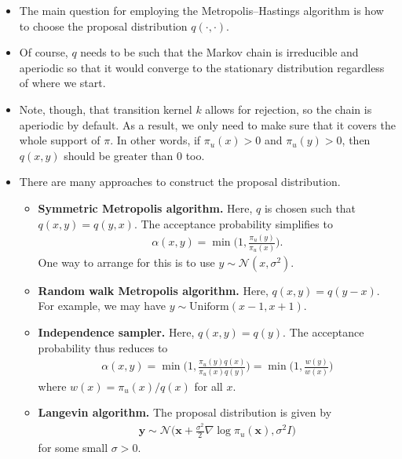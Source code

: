 \documentclass[10pt]{article}
\newcommand{\ve}[1]{\mathbf{#1}}
\newcommand{\mrm}[1]{\mathrm{#1}}
\newcommand{\mcal}[1]{\mathcal{#1}}
\begin{document}
\begin{itemize}
  \item The main question for employing the Metropolis--Hastings algorithm is how to choose the proposal distribution $q(\cdot, \cdot)$.
  
  \item Of course, $q$ needs to be such that the Markov chain is irreducible and aperiodic so that it would converge to the stationary distribution regardless of where we start.
    
  \item Note, though, that transition kernel $k$ allows for rejection, so the chain is aperiodic by default. As a result, we only need to make sure that it covers the whole support of $\pi$. In other words, if $\pi_u(x) > 0$ and $\pi_u(y) > 0$, then $q(x,y)$ should be greater than $0$ too.  

  \item There are many approaches to construct the proposal distribution.
  \begin{itemize}
    \item {\bf Symmetric Metropolis algorithm.} Here, $q$ is chosen such that $q(x,y) = q(y,x)$. The acceptance probability simplifies to
    \begin{align*}
      \alpha(x,y) = \min\bigg( 1, \frac{\pi_u(y)}{\pi_u(x)} \bigg).
    \end{align*}
    One way to arrange for this is to use $y \sim \mcal{N}(x, \sigma^2)$.

    \item {\bf Random walk Metropolis algorithm.} Here, $q(x,y) = q(y-x)$. For example, we may have $y \sim \mrm{Uniform}(x-1, x+1)$.
    
    \item {\bf Independence sampler.} Here, $q(x,y) = q(y)$. The acceptance probability thus reduces to
    \begin{align*}
      \alpha(x,y) 
      = \min\bigg( 1, \frac{\pi_u(y)q(x)}{\pi_u(x)q(y)} \bigg)
      = \min\bigg( 1, \frac{w(y)}{w(x)} \bigg)
    \end{align*}
    where $w(x) = \pi_u(x)/q(x)$ for all $x$.

    \item {\bf Langevin algorithm.} The proposal distribution is given by
    \begin{align*}
      \ve{y} \sim \mcal{N}\Big(\ve{x} + \frac{\sigma^2}{2} \nabla \log \pi_u(\ve{x}), \sigma^2 I \Big) 
    \end{align*}
    for some small $\sigma > 0$.    
  \end{itemize}


\end{itemize}
\end{document}

